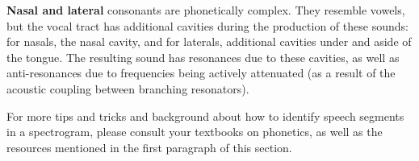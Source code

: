 \documentclass[
]{book}
\begin{document}
\textbf{Nasal and lateral} consonants are phonetically complex. They resemble vowels, but the vocal tract has additional cavities during the production of these sounds: for nasals, the nasal cavity, and for laterals, additional cavities under and aside of the tongue. The resulting sound has resonances due to these cavities, as well as anti-resonances due to frequencies being actively attenuated (as a result of the acoustic coupling between branching resonators).

For more tips and tricks and background about how to identify speech segments in a spectrogram, please consult your textbooks on phonetics, as well as the resources mentioned in the first paragraph of this section.

  
\end{document}
